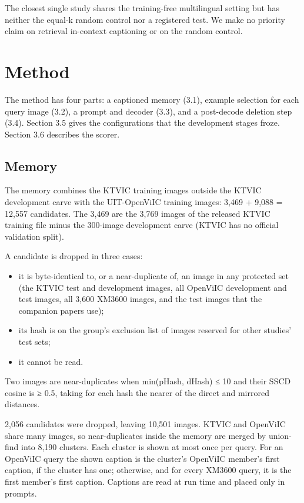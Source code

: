 \documentclass[manuscript,screen]{acmart}
\providecommand{\tightlist}{\setlength{\itemsep}{0pt}\setlength{\parskip}{0pt}}
\begin{document}
The closest single study \citep{Rebelo2025RSCap} shares the training-free multilingual setting but
has neither the equal-k random control nor a registered test. We make no priority claim on retrieval
in-context captioning or on the random control.

\section{Method}\label{method}

The method has four parts: a captioned memory (3.1), example selection for each query image (3.2), a
prompt and decoder (3.3), and a post-decode deletion step (3.4). Section 3.5 gives the
configurations that the development stages froze. Section 3.6 describes the scorer.

\subsection{Memory}\label{memory}

The memory combines the KTVIC training images outside the KTVIC development carve with the
UIT-OpenViIC training images: 3,469 + 9,088 = 12,557 candidates. The 3,469 are the 3,769 images of
the released KTVIC training file minus the 300-image development carve (KTVIC has no official
validation split).

A candidate is dropped in three cases:

\begin{itemize}
\tightlist
\item
  it is byte-identical to, or a near-duplicate of, an image in any protected set (the KTVIC test and
  development images, all OpenViIC development and test images, all 3,600 XM3600 images, and the
  test images that the companion papers use);
\item
  its hash is on the group's exclusion list of images reserved for other studies' test sets;
\item
  it cannot be read.
\end{itemize}

Two images are near-duplicates when min(pHash, dHash) ≤ 10 and their SSCD \citep{Pizzi2022SSCD}
cosine is ≥ 0.5, taking for each hash the nearer of the direct and mirrored distances.

2,056 candidates were dropped, leaving 10,501 images. KTVIC and OpenViIC share many images, so
near-duplicates inside the memory are merged by union-find into 8,190 clusters. Each cluster is
shown at most once per query. For an OpenViIC query the shown caption is the cluster's OpenViIC
member's first caption, if the cluster has one; otherwise, and for every XM3600 query, it is the
first member's first caption. Captions are read at run time and placed only in prompts.
\end{document}
